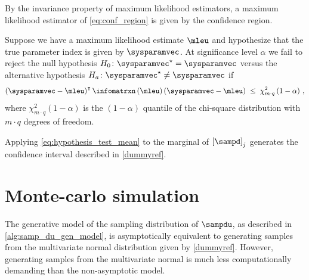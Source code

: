 \documentclass[../main.tex]{subfiles}
\begin{document}
By the invariance property of maximum likelihood estimators, a maximum likelihood estimator of \cref{eq:conf_region} is given by the confidence region.
\begin{definition}
Suppose we have a maximum likelihood estimate $\mleu$ and hypothesize that the true parameter index is given by $\sysparamvec$. At significance level $\alpha$ we fail to reject the null hypothesis $H_0 \colon \tparam\sysparamvec = \sysparamvec$ versus the alternative hypothesis $H_a \colon \tparam\sysparamvec \neq \sysparamvec$ if
\begin{equation}
\label{eq:hypothesis_test_mean}
    \left(\sysparamvec - \mleu\right)^\intercal \infomatrxn\left(\mleu\right) \left(\sysparamvec - \mleu\right) \;\leq\; \chi_{m \cdot q}^{2} \left(1-\alpha\right)\,,
\end{equation}
where $\chi_{m \cdot q}^2(1 - \alpha)$ is the $(1 - \alpha)$ quantile of the chi-square distribution with $m \cdot q$ degrees of freedom.
\end{definition}

Applying \cref{eq:hypothesis_test_mean} to the marginal of 
$\left[\sampd\right]_j$ generates the confidence interval described in 
\cref{dummyref}.

\section{Monte-carlo simulation}
\label{sec:app:monte_carlo}
The generative model of the sampling distribution of $\sampdu$, as described in 
\cref{alg:samp_du_gen_model}, is asymptotically equivalent to generating 
samples from the multivariate normal distribution given by \cref{dummyref}. 
However, generating samples from the multivariate normal is much less 
computationally demanding than the non-asymptotic model.
\end{document}
